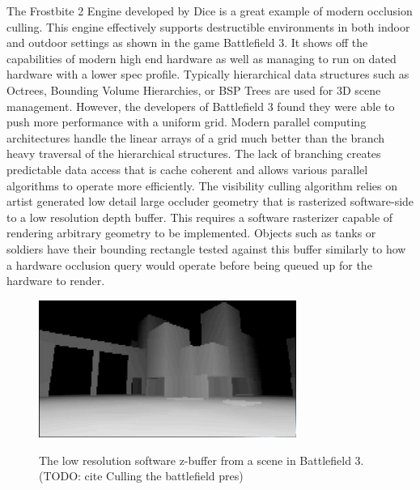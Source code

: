 \documentclass[12pt]{ucthesis}
\newcommand{\captionfonts}{\small\bf\ssp}
\begin{document}
The Frostbite 2 Engine developed by Dice is a great example of modern occlusion culling.\cite{culling-bf}
This engine effectively supports destructible environments in both indoor and outdoor settings as shown in the game Battlefield 3.
It shows off the capabilities of modern high end hardware as well as managing to run on dated hardware with a lower spec profile.
Typically hierarchical data structures such as Octrees, Bounding Volume Hierarchies, or BSP Trees are used for 3D scene management.\cite{CHC, CHCpp, GpuGem-Queries, dpvs}
However, the developers of Battlefield 3 found they were able to push more performance with a uniform grid.
Modern parallel computing architectures handle the linear arrays of a grid much better than the branch heavy traversal of the hierarchical structures.\cite{culling-bf}
The lack of branching creates predictable data access that is cache coherent and allows various parallel algorithms to operate more efficiently.
The visibility culling algorithm relies on artist generated low detail large occluder geometry that is rasterized software-side to a low resolution depth buffer.
This requires a software rasterizer capable of rendering arbitrary geometry to be implemented.
Objects such as tanks or soldiers have their bounding rectangle tested against this buffer similarly to how a hardware occlusion query would operate before being queued up for the hardware to render.

\begin{figure}
\begin{center}
\includegraphics[width=0.75\textwidth]{Images/Bf3Buffer.jpg}
\captionfonts
\caption[Software Z Buffer Buffer]{The low resolution software z-buffer from a scene in Battlefield 3. (TODO: cite Culling the battlefield pres)}
\label{fig:softare-z}
\end{center}
\end{figure}
\end{document}
